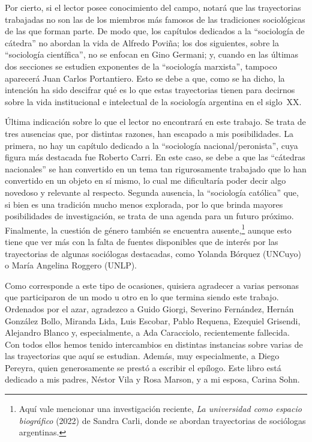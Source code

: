 Por cierto, si el lector posee conocimiento del campo, notará que las trayectorias trabajadas no son las de los miembros más famosos de las tradiciones sociológicas de las que forman parte. De modo que, los capítulos dedicados a la \enquote{sociología de cátedra} no abordan la vida de Alfredo Poviña; los dos siguientes, sobre la \enquote{sociología científica}, no se enfocan en Gino Germani; y, cuando en las últimas dos secciones se estudien exponentes de la \enquote{sociología marxista}, tampoco aparecerá Juan Carlos Portantiero. Esto se debe a que, como se ha dicho, la intención ha sido descifrar qué es lo que estas trayectorias tienen para decirnos sobre la vida institucional e intelectual de la sociología argentina en el siglo~XX.

Última indicación sobre lo que el lector no encontrará en este trabajo. Se trata de tres ausencias que, por distintas razones, han escapado a mis posibilidades. La primera, no hay un capítulo dedicado a la \enquote{sociología nacional/peronista}, cuya figura más destacada fue Roberto Carri. En este caso, se debe a que las \enquote{cátedras nacionales} se han convertido en un tema tan rigurosamente trabajado que lo han convertido en un objeto en sí mismo, lo cual me dificultaría poder decir algo novedoso y relevante al respecto. Segunda ausencia, la \enquote{sociología católica} que, si bien es una tradición mucho menos explorada, por lo que brinda mayores posibilidades de investigación, se trata de una agenda para un futuro próximo. Finalmente, la cuestión de género también se encuentra ausente,\footnote{Aquí vale mencionar una investigación reciente, \emph{La universidad como espacio biográfico} (2022) de Sandra Carli, donde se abordan trayectorias de sociólogas argentinas.} aunque esto tiene que ver más con la falta de fuentes disponibles que de interés por las trayectorias de algunas sociólogas destacadas, como Yolanda Bórquez (UNCuyo) o María Angelina Roggero (UNLP).

\froufrou

Como corresponde a este tipo de ocasiones, quisiera agradecer a varias personas que participaron de un modo u otro en lo que termina siendo este trabajo. Ordenados por el azar, agradezco a Guido Giorgi, Severino Fernández, Hernán González Bollo, Miranda Lida, Luis Escobar, Pablo Requena, Ezequiel Grisendi, Alejandro Blanco y, especialmente, a Ada Caracciolo, recientemente fallecida. Con todos ellos hemos tenido intercambios en distintas instancias sobre varias de las trayectorias que aquí se estudian. Además, muy especialmente, a Diego Pereyra, quien generosamente se prestó a escribir el epílogo. Este libro está dedicado a mis padres, Néstor Vila y Rosa Marson, y a mi esposa, Carina Sohn.

